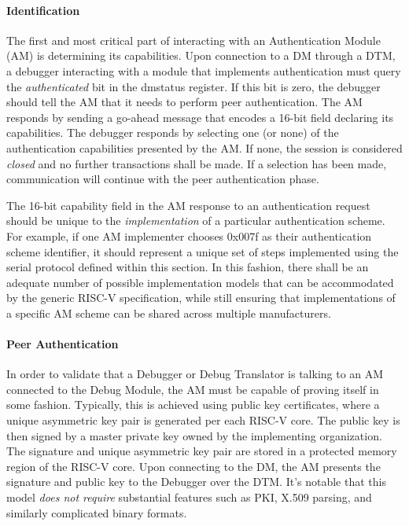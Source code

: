 \paragraph{Identification}
The first and most critical part of interacting with an Authentication Module (AM) is determining its capabilities. Upon connection to a DM through a DTM, a debugger interacting with a module that implements authentication must query the {\em authenticated} bit in the dmstatus register. If this bit is zero, the debugger should tell the AM that it needs to perform peer authentication. The AM responds by sending a go-ahead message that encodes a 16-bit field declaring its capabilities. The debugger responds by selecting one (or none) of the authentication capabilities presented by the AM. If none, the session is considered {\em closed} and no further transactions shall be made. If a selection has been made, communication will continue with the peer authentication phase. 

The 16-bit capability field in the AM response to an authentication request should be unique to the {\em implementation} of a particular authentication scheme. For example, if one AM implementer chooses 0x007f as their authentication scheme identifier, it should represent a unique set of steps implemented using the serial protocol defined within this section. In this fashion, there shall be an adequate number of possible implementation models that can be accommodated by the generic RISC-V specification, while still ensuring that implementations of a specific AM scheme can be shared across multiple manufacturers. 

\paragraph{Peer Authentication}
In order to validate that a Debugger or Debug Translator is talking to an AM connected to the Debug Module, the AM must be capable of proving itself in some fashion. Typically, this is achieved using public key certificates, where a unique asymmetric key pair is generated per each RISC-V core. The public key is then signed by a master private key owned by the implementing organization. The signature and unique asymmetric key pair are stored in a protected memory region of the RISC-V core. Upon connecting to the DM, the AM presents the signature and public key to the Debugger over the DTM. It's notable that this model {\em does not require} substantial features such as PKI, X.509 parsing, and similarly complicated binary formats. 

